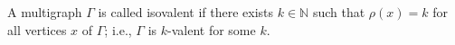 A multigraph $\Gamma$ is called isovalent if there exists $k \in \mathbb{N}$ such that $\rho(x) = k$ for all vertices $x$ of $\Gamma$; i.e., $\Gamma$ is $k$-valent for some $k$.
